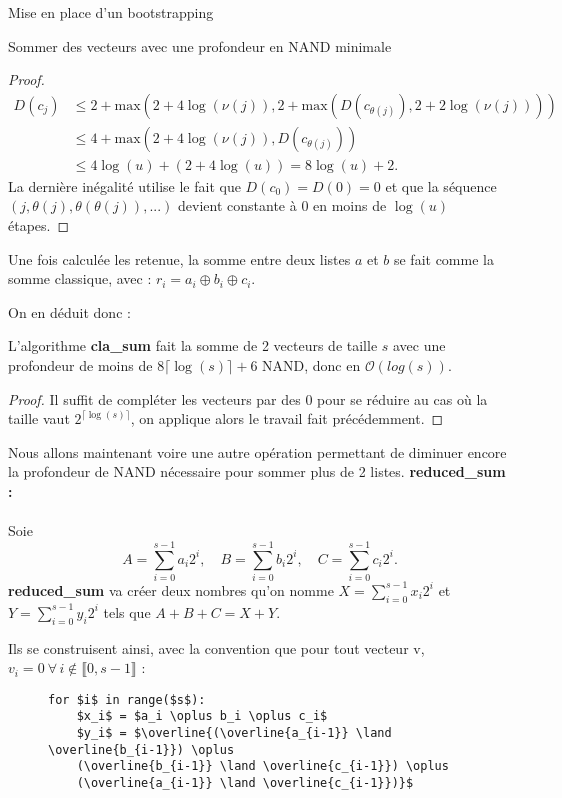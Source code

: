 \begin{section}{Mise en place d'un bootstrapping}
\begin{subsection}{Sommer des vecteurs avec une profondeur en NAND minimale}
\begin{proof}
\begin{align*}
D(c_j) &\leqslant 2 + \text{max}\left(2 + 4 \log(\nu(j)), 2 + \text{max}(D(c_{\theta(j)}), 2 + 2 \log(\nu(j)))\right) \\
&\leqslant 4 + \text{max}\left(2 + 4 \log(\nu(j)), D(c_{\theta(j)})\right) \\
& \leqslant 4 \log(u) + (2 + 4\log(u)) = 8 \log(u) + 2.
\end{align*}
La dernière inégalité utilise le fait que $D(c_0) = D(0) = 0$ et que la séquence $(j, \theta(j), \theta(\theta(j)), ...)$ devient constante à 0 en moins de $\log(u)$ étapes.
\end{proof}

	Une fois calculée les retenue, la somme entre deux listes $a$ et $b$ se fait comme la somme classique, avec : $r_i = a_i \oplus b_i \oplus c_i$.

	On en déduit donc :

\begin{thm}
	L'algorithme \textbf{cla\_sum} fait la somme de 2 vecteurs de taille $s$ avec une profondeur de moins de $8 \lceil \log(s) \rceil + 6$ NAND, donc en $\mathcal{O}(log(s))$.
\end{thm}

\begin{proof}
	Il suffit de compléter les vecteurs par des 0 pour se réduire au cas où la taille vaut $2^{\lceil \log(s) \rceil}$, on applique alors le travail fait précédemment.
\end{proof}

	Nous allons maintenant voire une autre opération permettant de diminuer encore la profondeur de NAND nécessaire pour sommer plus de 2 listes. 
\vspace{0.3cm}
\noindent
\textbf{reduced\_sum :}
\paragraph{}

	Soie
\[A = \sum_{i=0}^{s-1} a_i 2^i, \quad B = \sum_{i=0}^{s-1} b_i 2^i, \quad C = \sum_{i=0}^{s-1} c_i 2^i. \]
\textbf{reduced\_sum} va créer deux nombres qu'on nomme $X = \sum_{i=0}^{s-1} x_i 2^i$  et $Y = \sum_{i=0}^{s-1} y_i 2^i$ tels que $A + B + C = X + Y$.

	Ils se construisent ainsi, avec la convention que pour tout vecteur v, $v_i = 0 \  \forall \, i \not\in \llbracket 0, s-1 \rrbracket$ :
\begin{figure}[!h]
\begin{lstlisting}
for $i$ in range($s$):
	$x_i$ = $a_i \oplus b_i \oplus c_i$
	$y_i$ = $\overline{(\overline{a_{i-1}} \land \overline{b_{i-1}}) \oplus
	(\overline{b_{i-1}} \land \overline{c_{i-1}}) \oplus
	(\overline{a_{i-1}} \land \overline{c_{i-1}})}$
\end{lstlisting}
\end{figure}


\end{subsection}
\end{section}
